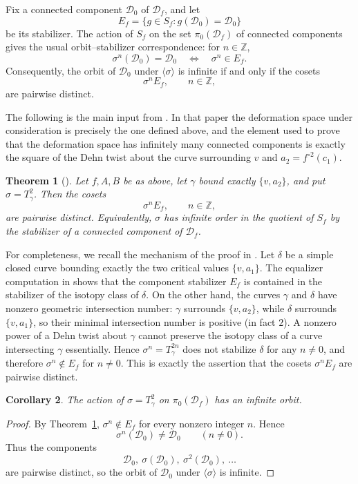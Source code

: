 \documentclass[11pt]{article}
\newtheorem{theorem}{Theorem}
\newtheorem{corollary}[theorem]{Corollary}
\newcommand{\D}{\mathcal D}
\begin{document}
Fix a connected component $\D_0$ of $\D_f$, and let
\[
  E_f=\{g\in S_f: g(\D_0)=\D_0\}
\]
be its stabilizer.  The action of $S_f$ on the set $\pi_0(\D_f)$ of connected components gives the usual orbit--stabilizer correspondence: for $n\in\mathbb Z$,
\[
  \sigma^n(\D_0)=\D_0
  \quad\Longleftrightarrow\quad
  \sigma^n\in E_f.
\]
Consequently, the orbit of $\D_0$ under $\langle\sigma\rangle$ is infinite if and only if the cosets
\[
  \sigma^nE_f,\qquad n\in\mathbb Z,
\]
are pairwise distinct.

The following is the main input from \cite{discDef}.  In that paper the deformation space under consideration is precisely the one defined above, and the element used to prove that the deformation space has infinitely many connected components is exactly the square of the Dehn twist about the curve surrounding $v$ and $a_2=f^{\circ2}(c_1)$.

\begin{theorem}[{\cite[Theorem~1.3 and its proof]{discDef}}]\label{thm:AK}
Let $f,A,B$ be as above, let $\gamma$ bound exactly $\{v,a_2\}$, and put $\sigma=T_\gamma^2$.  Then the cosets
\[
  \sigma^nE_f,\qquad n\in\mathbb Z,
\]
are pairwise distinct.  Equivalently, $\sigma$ has infinite order in the quotient of $S_f$ by the stabilizer of a connected component of $\D_f$.
\end{theorem}

For completeness, we recall the mechanism of the proof in \cite{discDef}.  Let $\delta$ be a simple closed curve bounding exactly the two critical values $\{v,a_1\}$.  The equalizer computation in \cite{discDef} shows that the component stabilizer $E_f$ is contained in the stabilizer of the isotopy class of $\delta$.  On the other hand, the curves $\gamma$ and $\delta$ have nonzero geometric intersection number: $\gamma$ surrounds $\{v,a_2\}$, while $\delta$ surrounds $\{v,a_1\}$, so their minimal intersection number is positive (in fact $2$).  A nonzero power of a Dehn twist about $\gamma$ cannot preserve the isotopy class of a curve intersecting $\gamma$ essentially.  Hence $\sigma^n=T_\gamma^{2n}$ does not stabilize $\delta$ for any $n\ne0$, and therefore $\sigma^n\notin E_f$ for $n\ne0$.  This is exactly the assertion that the cosets $\sigma^nE_f$ are pairwise distinct.

\begin{corollary}
The action of $\sigma=T_\gamma^2$ on $\pi_0(\D_f)$ has an infinite orbit.
\end{corollary}

\begin{proof}
By Theorem~\ref{thm:AK}, $\sigma^n\notin E_f$ for every nonzero integer $n$.  Hence
\[
  \sigma^n(\D_0)\ne\D_0\qquad(n\ne0).
\]
Thus the components
\[
  \D_0,\ \sigma(\D_0),\ \sigma^2(\D_0),\ \dots
\]
are pairwise distinct, so the orbit of $\D_0$ under $\langle\sigma\rangle$ is infinite.
\end{proof}
\end{document}
